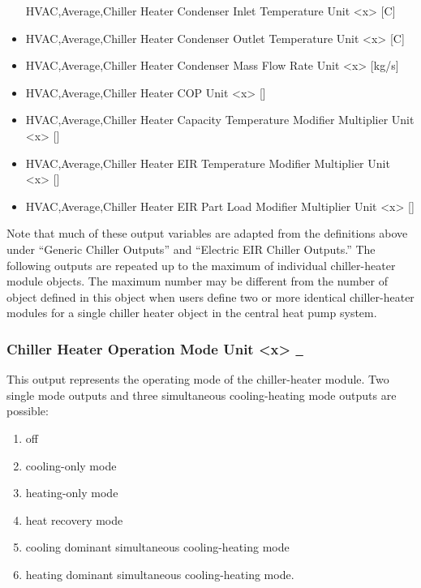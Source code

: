\begin{itemize}
  HVAC,Average,Chiller Heater Condenser Inlet Temperature Unit \textless{}x\textgreater{} {[}C{]}
\item
  HVAC,Average,Chiller Heater Condenser Outlet Temperature Unit \textless{}x\textgreater{} {[}C{]}
\item
  HVAC,Average,Chiller Heater Condenser Mass Flow Rate Unit \textless{}x\textgreater{} {[}kg/s{]}
\item
  HVAC,Average,Chiller Heater COP Unit \textless{}x\textgreater{} {[]}
\item
  HVAC,Average,Chiller Heater Capacity Temperature Modifier Multiplier Unit \textless{}x\textgreater{} {[]}
\item
  HVAC,Average,Chiller Heater EIR Temperature Modifier Multiplier Unit \textless{}x\textgreater{} {[]}
\item
  HVAC,Average,Chiller Heater EIR Part Load Modifier Multiplier Unit \textless{}x\textgreater{} {[]}
\end{itemize}

Note that much of these output variables are adapted from the definitions above under ``Generic Chiller Outputs'' and ``Electric EIR Chiller Outputs.'' The following outputs are repeated up to the maximum of individual chiller-heater module objects. The maximum number may be different from the number of object defined in this object when users define two or more identical chiller-heater modules for a single chiller heater object in the central heat pump system.

\subsubsection{Chiller Heater Operation Mode Unit \textless{}x\textgreater{} \protect\hyperlink{section-1}{~}}\label{chiller-heater-operation-mode-unit-x}

This output represents the operating mode of the chiller-heater module. Two single mode outputs and three simultaneous cooling-heating mode outputs are possible:

\begin{enumerate}
\def\labelenumi{\arabic{enumi}.}
\setcounter{enumi}{-1}
\item
  off
\item
  cooling-only mode
\item
  heating-only mode
\item
  heat recovery mode
\item
  cooling dominant simultaneous cooling-heating mode
\item
  heating dominant simultaneous cooling-heating mode.
\end{enumerate}


